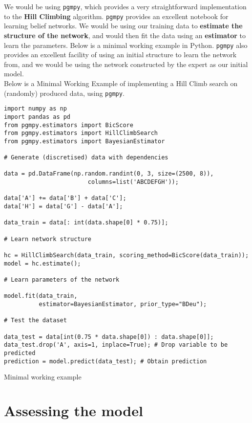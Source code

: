 We would be using \texttt{pgmpy}, which provides a very straightforward implementation to the \textbf{Hill Climbing} algorithm. \texttt{pgmpy} provides an excellent notebook \cite{pgmpynotebook} for learning belief networks. We would be using our training data to \textbf{estimate the structure of the network}, and would then fit the data using an \textbf{estimator} to learn the parameters. Below is a minimal working example in Python. \texttt{pgmpy} also provides an excellent facility of using an initial structure to learn the network from, and we would be using the network constructed by the expert as our initial model.  \\

Below is a Minimal Working Example of implementing a Hill Climb search on (randomly) produced data, using \texttt{pgmpy}.

\begin{listing}[!htbp]
\begin{verbatim}
import numpy as np
import pandas as pd
from pgmpy.estimators import BicScore
from pgmpy.estimators import HillClimbSearch
from pgmpy.estimators import BayesianEstimator

# Generate (discretised) data with dependencies

data = pd.DataFrame(np.random.randint(0, 3, size=(2500, 8)),
                        columns=list('ABCDEFGH'));

data['A'] += data['B'] + data['C'];
data['H'] = data['G'] - data['A'];

data_train = data[: int(data.shape[0] * 0.75)];

# Learn network structure

hc = HillClimbSearch(data_train, scoring_method=BicScore(data_train));
model = hc.estimate();

# Learn parameters of the network

model.fit(data_train,
          estimator=BayesianEstimator, prior_type="BDeu");

# Test the dataset

data_test = data[int(0.75 * data.shape[0]) : data.shape[0]]; 
data_test.drop('A', axis=1, inplace=True); # Drop variable to be predicted
prediction = model.predict(data_test); # Obtain prediction
\end{verbatim}
\caption{Minimal working example}
\label{listing:1}
\end{listing}

\section{Assessing the model}

